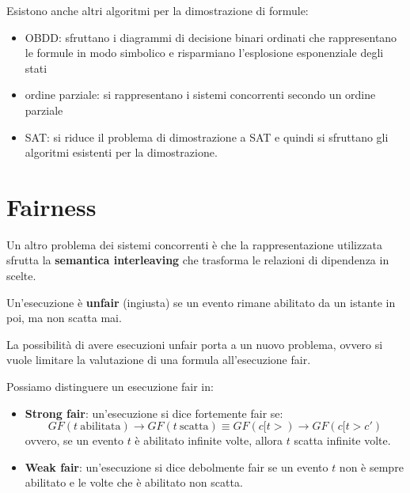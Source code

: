 Esistono anche altri algoritmi per la dimostrazione di formule:
\begin{itemize}
    \item OBDD: sfruttano i diagrammi di decisione binari ordinati che rappresentano
    le formule in modo simbolico e risparmiano l'esplosione esponenziale degli stati
    \item ordine parziale: si rappresentano i sistemi concorrenti secondo un ordine
    parziale 
    \item SAT: si riduce il problema di dimostrazione a SAT e quindi si sfruttano
    gli algoritmi esistenti per la dimostrazione.
\end{itemize}

\section{Fairness}
Un altro problema dei sistemi concorrenti è che la rappresentazione utilizzata sfrutta
la \textbf{semantica interleaving} che trasforma le relazioni di dipendenza in scelte.

\begin{definizione}
    Un'esecuzione è \textbf{unfair} (ingiusta) se un evento rimane abilitato da
    un istante in poi, ma non scatta mai.
\end{definizione}
La possibilità di avere esecuzioni unfair porta a un nuovo problema, ovvero si
vuole limitare la valutazione di una formula all'esecuzione fair.

Possiamo distinguere un esecuzione fair in:
\begin{itemize}
    \item \textbf{Strong fair}: un'esecuzione si dice fortemente fair se:
          \begin{equation}
              GF(t \ \text{abilitata}) \to GF(t \ \text{scatta}) \equiv
              GF(c[t>) \to GF(c[t>c')
          \end{equation}
          ovvero, se un evento $t$ è abilitato infinite volte, allora $t$ scatta
          infinite volte.
    \item \textbf{Weak fair}: un'esecuzione si dice debolmente fair se un evento
          $t$ non è sempre abilitato e le volte che è abilitato non scatta.
\end{itemize}